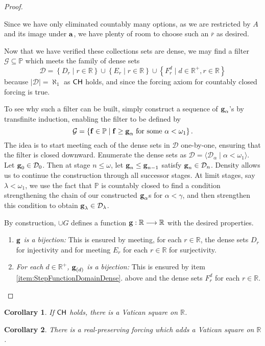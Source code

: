 \documentclass[11pt]{amsart}
\newtheorem{corollary}{Corollary}
\theoremstyle{definition}
\theoremstyle{remark}
\renewcommand{\P}{\mathbb{P}}
\newcommand{\R}{\mathbb{R}}
\newcommand{\CH}{\textup{\textsf{CH}}}
\newcommand{\st}{\; | \;}
\newcommand{\set}[2]{\left\{#1\st #2 \right\}}
\newcommand{\seq}[2]{\langle #1 \st #2 \rangle}
\newcommand{\To}{\longrightarrow}
\renewcommand{\a}{\textup{\textbf{a}}}
\newcommand{\g}{\textup{\textbf{g}}}
\newcommand{\f}{\textup{\textbf{f}}}
\renewcommand{\r}{\overline r}
\begin{document}
\begin{proof}
\begin{enumerate}
Since we have only eliminated countably many options, as we are restricted by $A$ and its image under $\a$, we have plenty of room to choose such an $\r$ as desired.\\
\end{enumerate}

Now that we have verified these collections sets are dense, we may find a filter $\mathcal G\subseteq \P$ which meets the family of dense sets $$\mathcal D = \set{D_r}{r\in \R} \cup \set{E_r}{r \in \R} \cup \set{F^d_r}{d \in \R^+, r \in \R}$$ because $|\mathcal D|=\aleph_1$ as $\CH$ holds, and since the forcing axiom for countably closed forcing is true. 

To see why such a filter can be built, simply construct a sequence of $\g_\alpha$'s by transfinite induction, enabling the filter to be defined by 
	$$\mathcal G=\set{\f \in \P}{\f \geq \g_\alpha \text{ for some } \alpha<\omega_1}.$$ 
The idea is to start meeting each of the dense sets in $\mathcal D$ one-by-one, ensuring that the filter is closed downward. Enumerate the dense sets as $\mathcal D = \seq{\mathcal D_\alpha}{\alpha<\omega_1}$. Let $\g_0 \in \mathcal D_0$. Then at stage $n \leq \omega$, let $\g_n \leq \g_{n-1}$ satisfy $\g_n \in \mathcal D_n$. Density allows us to continue the construction through all successor stages. At limit stages, say $\lambda <\omega_1$, we use the fact that $\P$ is countably closed to find a condition strengthening the chain of our constructed $\g_\alpha$s for $\alpha<\gamma$, and then strengthen this condition to obtain $\g_\lambda \in \mathcal D_\lambda$.

By construction, $\cup G$ defines a function $\g: \R \To \R$ with the desired properties. \begin{enumerate}
	\item \emph{$\g$ is a bijection:} This is ensured by meeting, for each $r \in \R$, the dense sets $D_r$ for injectivity and for meeting $E_r$ for each $r \in \R$ for surjectivity.\\
	\item \emph{For each $d \in \R^+$, $\g_{(d)}$ is a bijection:} This is ensured by item \ref{item:StepFunctionDomainDense}. above and the dense sets $F^d_r$ for each $r \in \R$. \qedhere
\end{enumerate}
\end{proof}
		
\begin{corollary} If $\CH$ holds, there is a Vatican square on $\R$. \end{corollary}
\begin{corollary} There is a real-preserving forcing which adds a Vatican square on $\R$. \end{corollary}
\end{document}
